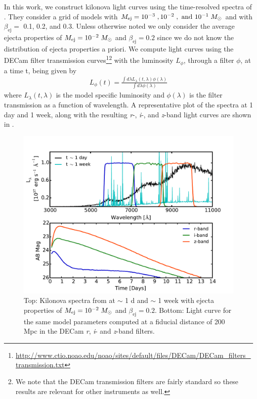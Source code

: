 In this work, we construct kilonova light curves using the time-resolved spectra of \citet{BarnesKasen13}. They consider a grid of models with $M_{\rm ej} = 10^{-3}\;, 10^{-2} \;, \text{ and } 10^{-1} \;M_{\odot}$ and with $\beta_{\text{ej}} = $ 0.1, 0.2, and 0.3. Unless otherwise noted we only consider the average ejecta properties of $M_{\rm ej} =10^{-2}\;M_{\odot}$ and $\beta_{\text{ej}} = 0.2$ since we do not know the distribution of ejecta properties a priori. We compute light curves using the DECam filter transmission curves\footnote{\singlespace \url{http://www.ctio.noao.edu/noao/sites/default/files/DECam/DECam_filters_transmission.txt}}\footnote{\singlespace We note that the DECam transmission filters are fairly standard so these results are relevant for other instruments as well.} with the luminosity $L_{\phi}$, through a filter $\phi$, at a time t, being given by 
\begin{align}
\label{eq:LCint}
L_{\phi}(t) = \frac{\int d\lambda L_{\lambda}(t,\lambda) \phi(\lambda)}{\int d\lambda \phi(\lambda)}
\end{align}
\noindent where $L_{\lambda}(t,\lambda)$ is the model specific luminosity and $\phi(\lambda)$ is the filter transmission as a function of wavelength. A representative plot of the spectra at 1 day and 1 week, along with the resulting {\em r}-, {\em i}-, and {\em z}-band light curves are shown in .

\begin{figure}[t!]
\centering
\includegraphics[width=\textwidth]{./figs/chapter2/f1.pdf}
\caption{\singlespace Top: Kilonova spectra from \citet{BarnesKasen13} at $\sim$ 1 d and $\sim$ 1 week with ejecta properties of $M_{\rm ej} =10^{-2}\;M_{\odot}$ and $\beta_{\text{ej}} = 0.2$. Bottom: Light curve for the same model parameters computed at a fiducial distance of 200 Mpc in the DECam {\em r}, {\em i}- and {\em z}-band filters. \vspace{10pt}}
\label{fig:ch2_kilosample}
\end{figure}

